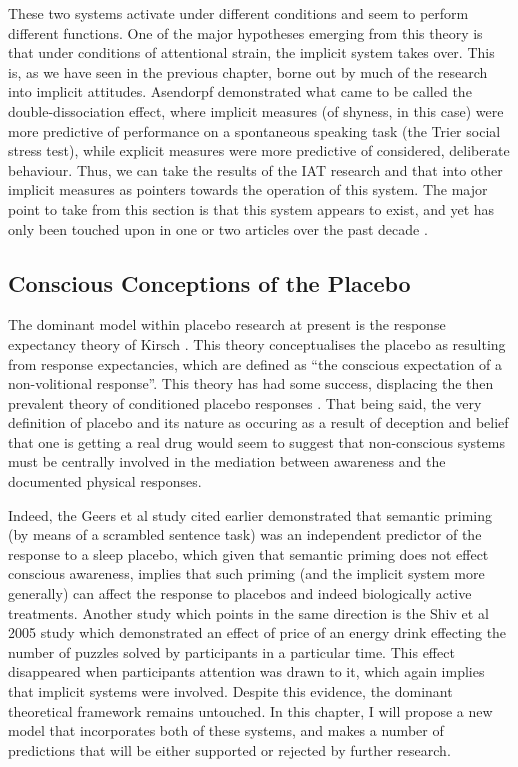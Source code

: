 These two systems activate under different conditions and seem to perform different functions. One of the major hypotheses emerging from this theory is that under conditions of attentional strain, the implicit system takes over. This is, as we have seen in the previous chapter, borne out by much of the research into implicit attitudes. Asendorpf \cite{Asendorpf2002} demonstrated what came to be called the double-dissociation effect, where implicit measures (of shyness, in this case) were more predictive of performance on a spontaneous speaking task (the Trier social stress test), while explicit measures were more predictive of considered, deliberate behaviour. Thus, we can take the results of the IAT research and that into other implicit measures as pointers towards the operation of this system. The major point to take from this section is that this system appears to exist, and yet has only been touched upon in one or two articles over the past decade \cite{Geers2005}. 

\subsection{Conscious Conceptions of the Placebo}

The dominant model within placebo research at present is the response expectancy theory of Kirsch \cite{Kirsch1985, Kirsch1997a}. This theory conceptualises the placebo as resulting from response expectancies, which are defined as ``the conscious expectation of a non-volitional response''. This theory has had some success, displacing the then prevalent theory of conditioned placebo responses \cite{Vuodouris1985}. That being said, the very definition of placebo and its nature as occuring as a result of deception and belief that one is getting a real drug would seem to suggest that non-conscious systems must be centrally involved in the mediation between awareness and the documented physical responses. 

Indeed, the Geers et al study cited earlier \cite{Geers2005} demonstrated that semantic priming (by means of a scrambled sentence task) was an independent predictor of the response to a sleep placebo, which given that semantic priming does not effect conscious awareness, implies that such priming (and the implicit system more generally) can affect the response to placebos and indeed biologically active treatments. Another study which points in the same direction is the Shiv et al 2005 \cite{Shiv2005a} study which demonstrated an effect of price of an energy drink effecting the number of puzzles solved by participants in a particular time. This effect disappeared when participants attention was drawn to it, which again implies that implicit systems were involved. Despite this evidence, the dominant theoretical framework remains untouched. In this chapter, I will propose a new model that incorporates both of these systems, and makes a number of predictions that will be either supported or rejected by further research. 


